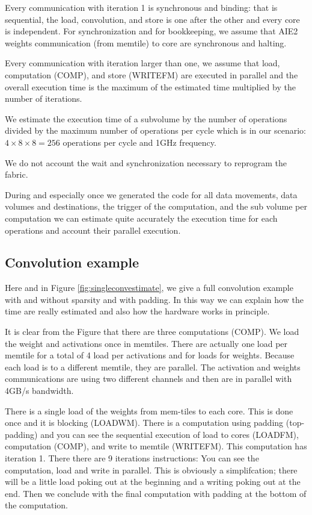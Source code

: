 \documentclass[conference]{IEEEtran}
\begin{document}
Every communication with iteration 1 is synchronous and binding: that
is sequential, the load, convolution, and store is one after the other
and every core is independent.  For synchronization and for
bookkeeping, we assume that AIE2 weights communication (from memtile)
to core are synchronous and halting.

Every communication with iteration larger than one, we assume that
load, computation (COMP), and store (WRITEFM) are executed in parallel
and the overall execution time is the maximum of the estimated time
multiplied by the number of iterations.

We estimate the execution time of a subvolume by the number of
operations divided by the maximum number of operations per cycle which
is in our scenario: $4\times 8 \times 8 = 256 $ operations per cycle
and 1GHz frequency.

We do not account the wait and synchronization necessary to reprogram
the fabric.

During and especially once we generated the code for all data
movements, data volumes and destinations, the trigger of the
computation, and the sub volume per computation we can estimate quite
accurately the execution time for each operations and account their
parallel execution.

\subsection{Convolution example}
 Here and in Figure
\ref{fig:singleconvestimate}, we give a full convolution example with
and without sparsity and with padding. In this way we can explain how
the time are really estimated and also how the hardware works in
principle.

It is clear from the Figure that there are three computations
(COMP). We load the weight and activations once in memtiles. There are
actually one load per memtile for a total of 4 load per activations
and for loads for weights. Because each load is to a different
memtile, they are parallel.  The activation and weights communications
are using two different channels and then are in parallel with 4GB/s
bandwidth.

There is a single load of the weights from mem-tiles to each
core. This is done once and it is blocking (LOADWM). There is a
computation using padding (top-padding) and you can see the sequential
execution of load to cores (LOADFM), computation (COMP), and write to
memtile (WRITEFM). This computation has iteration 1. There there are 9
iterations instructions: You can see the computation, load and write
in parallel. This is obviously a simplifcation; there will be a little
load poking out at the beginning and a writing poking out at the end.
Then we conclude with the final computation with padding at the bottom
of the computation.
\end{document}

